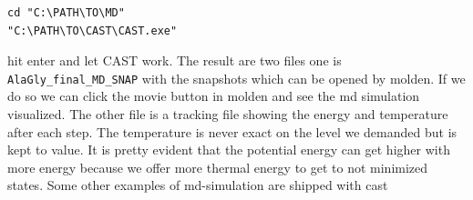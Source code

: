 \documentclass[a4paper,11pt]{scrartcl}
\begin{document}
\begin{lstlisting}[frame=single,]
cd "C:\PATH\TO\MD"
"C:\PATH\TO\CAST\CAST.exe"
\end{lstlisting}

hit enter and let CAST work. The result are two files one is \texttt{AlaGly\_final\_MD\_SNAP} with the snapshots which can be opened by molden. If we do so we can click the movie button in molden and see the \ac{md} simulation visualized. The other file is a tracking file showing the energy and temperature after each step. The temperature is never exact on the level we demanded but is kept to value. It is pretty evident that the potential energy can get higher with more energy because we offer more thermal energy to get to not minimized states. Some other examples of \ac{md}-simulation are shipped with \ac{cast}
\end{document}
